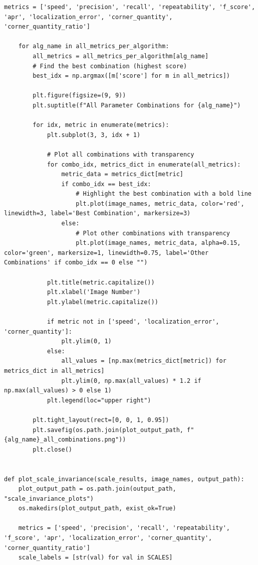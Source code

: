 \documentclass[journal]{IEEEtran}
\begin{document}
\begin{lstlisting}[style=python, caption={Utility Functions for Data Processing}, label={lst:utilities}]
    metrics = ['speed', 'precision', 'recall', 'repeatability', 'f_score', 'apr', 'localization_error', 'corner_quantity', 'corner_quantity_ratio']
    
    for alg_name in all_metrics_per_algorithm:
        all_metrics = all_metrics_per_algorithm[alg_name]
        # Find the best combination (highest score)
        best_idx = np.argmax([m['score'] for m in all_metrics])
        
        plt.figure(figsize=(9, 9))
        plt.suptitle(f"All Parameter Combinations for {alg_name}")
        
        for idx, metric in enumerate(metrics):
            plt.subplot(3, 3, idx + 1)
            
            # Plot all combinations with transparency
            for combo_idx, metrics_dict in enumerate(all_metrics):
                metric_data = metrics_dict[metric]
                if combo_idx == best_idx:
                    # Highlight the best combination with a bold line
                    plt.plot(image_names, metric_data, color='red', linewidth=3, label='Best Combination', markersize=3)
                else:
                    # Plot other combinations with transparency
                    plt.plot(image_names, metric_data, alpha=0.15, color='green', markersize=1, linewidth=0.75, label='Other Combinations' if combo_idx == 0 else "")
            
            plt.title(metric.capitalize())
            plt.xlabel('Image Number') 
            plt.ylabel(metric.capitalize())

            if metric not in ['speed', 'localization_error', 'corner_quantity']:
                plt.ylim(0, 1)
            else:
                all_values = [np.max(metrics_dict[metric]) for metrics_dict in all_metrics]
                plt.ylim(0, np.max(all_values) * 1.2 if np.max(all_values) > 0 else 1)
            plt.legend(loc="upper right")
        
        plt.tight_layout(rect=[0, 0, 1, 0.95])
        plt.savefig(os.path.join(plot_output_path, f"{alg_name}_all_combinations.png"))
        plt.close()
        

def plot_scale_invariance(scale_results, image_names, output_path):
    plot_output_path = os.path.join(output_path, "scale_invariance_plots")
    os.makedirs(plot_output_path, exist_ok=True)
    
    metrics = ['speed', 'precision', 'recall', 'repeatability', 'f_score', 'apr', 'localization_error', 'corner_quantity', 'corner_quantity_ratio']
    scale_labels = [str(val) for val in SCALES]
    

\end{lstlisting}
\end{document}
